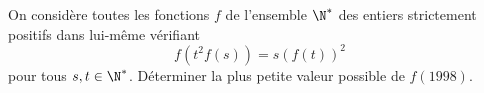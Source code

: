 On considère toutes les fonctions $f$ de l'ensemble $\N^*$ des entiers strictement positifs dans lui-même vérifiant
\[
f(t^2 f(s)) = s(f(t))^2
\]
pour tous $s, t \in \N^*$. Déterminer la plus petite valeur possible de $f(1998)$.
